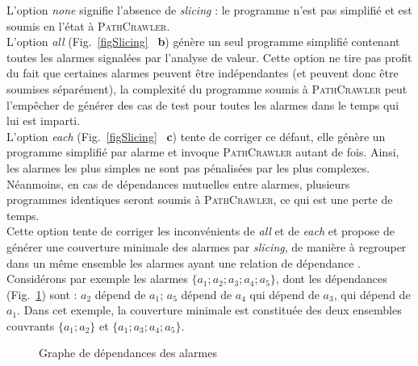 

L'option {\em none} signifie l'absence de {\em slicing} : le programme n'est pas
simplifié et est soumis en l'état à \textsc{PathCrawler}.\\

L'option {\em all} (Fig.~\ref{figSlicing} ~\textbf{b}) génère un seul programme
simplifié contenant toutes les alarmes signalées par l'analyse de valeur. Cette
option ne tire pas profit du fait que certaines alarmes peuvent être
indépendantes (et peuvent donc être soumises séparément), la complexité du
programme soumis à \textsc{PathCrawler} peut l'empêcher de générer des cas de
test pour toutes les alarmes dans le temps qui lui est imparti.\\

L'option {\em each} (Fig.~\ref{figSlicing} ~\textbf{c}) tente de corriger ce
défaut, elle génère un programme simplifié par alarme et invoque
\textsc{PathCrawler} autant de fois. Ainsi, les alarmes les plus simples ne sont
pas pénalisées par les plus complexes. Néanmoins, en cas de dépendances
mutuelles entre alarmes, plusieurs programmes identiques seront soumis à
\textsc{PathCrawler}, ce qui est une perte de temps.\\




Cette option tente de corriger les inconvénients de {\em all} et de {\em each}
et propose de générer une couverture minimale des alarmes par {\em slicing}, de
manière à regrouper dans un même ensemble les alarmes ayant une relation de
dépendance \cite{SANTE}.
Considérons par exemple les alarmes $\{a_1; a_2; a_3; a_4; a_5\}$, dont les
dépendances (Fig.~\ref{fig:deps}) sont : $a_2$ dépend de $a_1$; $a_5$ dépend de
$a_4$ qui dépend de $a_3$, qui dépend de $a_1$.
Dans cet exemple, la couverture minimale est constituée des deux ensembles
couvrants $\{a_1; a_2\}$ et $\{a_1; a_3; a_4; a_5\}$.\\


\begin{figure}
  \centering
  \caption{Graphe de dépendances des alarmes}
  \label{fig:deps}
\end{figure}


